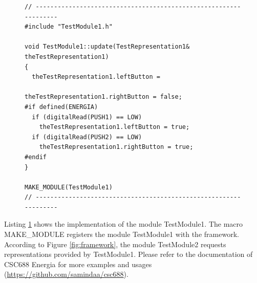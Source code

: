 \documentclass{llncs}
\begin{document}
\begin{sloppy}
\begin{figure}[!ht]
\begin{center}
\begin{verbatim}
// -----------------------------------------------------------------
#include "TestModule1.h"

void TestModule1::update(TestRepresentation1& theTestRepresentation1)
{
  theTestRepresentation1.leftButton = 
                          theTestRepresentation1.rightButton = false;
#if defined(ENERGIA)
  if (digitalRead(PUSH1) == LOW)
    theTestRepresentation1.leftButton = true;
  if (digitalRead(PUSH2) == LOW)
    theTestRepresentation1.rightButton = true;
#endif
}

MAKE_MODULE(TestModule1)
// -----------------------------------------------------------------
\end{verbatim}
\end{center}
\label{list:TestModule1.cpp}
\end{figure}


Listing \ref{list:TestModule1.cpp} shows the implementation of the module {\sf TestModule1}.  The
macro {\sf MAKE\_MODULE} registers the module {\sf TestModule1} with the framework. According to
Figure \ref{fig:framework}, the module {\sf TestModule2} requests representations provided by {\sf
TestModule1}. Please refer to the documentation of CSC688 Energia for more examples and usages
(\url{https://github.com/samindaa/csc688}).  




\end{sloppy}
\end{document}
